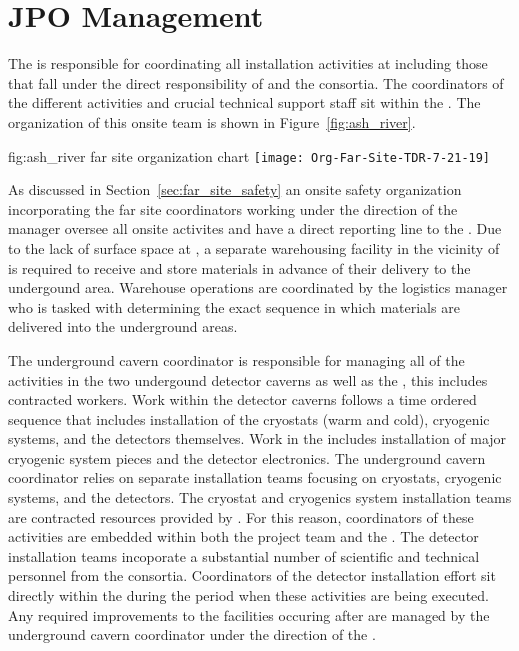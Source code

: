 \section{JPO Management}
\label{vl:tc-facility_mgmt}

The  is responsible for coordinating all 
installation activities at  including those that fall 
under the direct responsibility of  and the  
consortia.  The coordinators of the different activities and crucial 
technical support staff sit within the .  The organization
of this onsite team is shown in Figure~\ref{fig:ash_river}.  
\begin{dunefigure}{fig:ash_river}
  {far site organization chart}
  \texttt{[image: Org-Far-Site-TDR-7-21-19]}
\end{dunefigure}
 
As discussed in Section~\ref{sec:far_site_safety} an onsite safety 
organization incorporating the far site  coordinators
working under the direction of the  
 manager oversee all onsite activites and have a direct 
reporting line to the .  Due to the lack of surface space 
at , a separate warehousing facility in the vicinity of 
 is required to receive and store materials in advance 
of their delivery to the undergound area.  Warehouse operations are 
coordinated by the  logistics manager who is tasked 
with determining the exact sequence in which materials are delivered
into the underground areas.         

The underground cavern coordinator is responsible for managing all of
the activities in the two undergound detector caverns as well as the
, this includes contracted workers.  Work within the
detector caverns follows a time ordered sequence that includes
installation of the cryostats (warm and cold), cryogenic systems, and
the detectors themselves.  Work in the  includes
installation of major cryogenic system pieces and the detector
 electronics.  The underground cavern coordinator relies on
separate installation teams focusing on cryostats, cryogenic systems,
and the detectors.  The cryostat and cryogenics system installation
teams are contracted resources provided by .  For this
reason, coordinators of these activities are embedded within both the
 project team and the .  The detector
installation teams incoporate a substantial number of scientific and
technical personnel from the  consortia.  Coordinators of
the detector installation effort sit directly within the 
during the period when these activities are being executed.  Any
required improvements to the facilities occuring after
 are managed by the underground cavern coordinator under
the direction of the .


